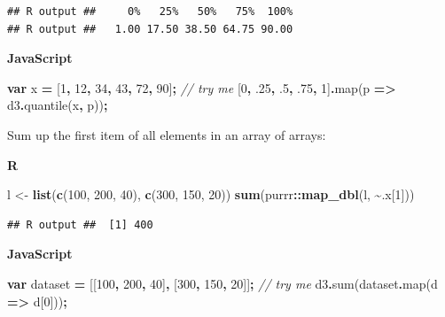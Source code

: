 \documentclass[
  openany]{book}
\newenvironment{Shaded}{\begin{snugshade}}{\end{snugshade}}
\newcommand{\CommentTok}[1]{\textcolor[rgb]{0.56,0.35,0.01}{\textit{#1}}}
\newcommand{\DecValTok}[1]{\textcolor[rgb]{0.00,0.00,0.81}{#1}}
\newcommand{\FloatTok}[1]{\textcolor[rgb]{0.00,0.00,0.81}{#1}}
\newcommand{\FunctionTok}[1]{\textcolor[rgb]{0.00,0.00,0.00}{#1}}
\newcommand{\KeywordTok}[1]{\textcolor[rgb]{0.13,0.29,0.53}{\textbf{#1}}}
\newcommand{\NormalTok}[1]{#1}
\newcommand{\OperatorTok}[1]{\textcolor[rgb]{0.81,0.36,0.00}{\textbf{#1}}}
\newcommand{\StringTok}[1]{\textcolor[rgb]{0.31,0.60,0.02}{#1}}
\begin{document}
\begin{verbatim}
## R output ##     0%   25%   50%   75%  100% 
## R output ##   1.00 17.50 38.50 64.75 90.00
\end{verbatim}

\textbf{JavaScript}

\begin{Shaded}
\begin{Highlighting}[]
\KeywordTok{var}\NormalTok{ x }\OperatorTok{=}\NormalTok{ [}\DecValTok{1}\OperatorTok{,} \DecValTok{12}\OperatorTok{,} \DecValTok{34}\OperatorTok{,} \DecValTok{43}\OperatorTok{,} \DecValTok{72}\OperatorTok{,} \DecValTok{90}\NormalTok{]}\OperatorTok{;}      \CommentTok{// try me}
\NormalTok{[}\DecValTok{0}\OperatorTok{,} \FloatTok{.25}\OperatorTok{,} \FloatTok{.5}\OperatorTok{,} \FloatTok{.75}\OperatorTok{,} \DecValTok{1}\NormalTok{]}\OperatorTok{.}\FunctionTok{map}\NormalTok{(p }\KeywordTok{=\textgreater{}}\NormalTok{ d3}\OperatorTok{.}\FunctionTok{quantile}\NormalTok{(x}\OperatorTok{,}\NormalTok{ p))}\OperatorTok{;}
\end{Highlighting}
\end{Shaded}

Sum up the first item of all elements in an array of arrays:

\textbf{R}

\begin{Shaded}
\begin{Highlighting}[]
\NormalTok{l \textless{}{-}}\StringTok{ }\KeywordTok{list}\NormalTok{(}\KeywordTok{c}\NormalTok{(}\DecValTok{100}\NormalTok{, }\DecValTok{200}\NormalTok{, }\DecValTok{40}\NormalTok{), }\KeywordTok{c}\NormalTok{(}\DecValTok{300}\NormalTok{, }\DecValTok{150}\NormalTok{, }\DecValTok{20}\NormalTok{))}
\KeywordTok{sum}\NormalTok{(purrr}\OperatorTok{::}\KeywordTok{map\_dbl}\NormalTok{(l, }\OperatorTok{\textasciitilde{}}\NormalTok{.x[}\DecValTok{1}\NormalTok{]))}
\end{Highlighting}
\end{Shaded}

\begin{verbatim}
## R output ##  [1] 400
\end{verbatim}

\textbf{JavaScript}

\begin{Shaded}
\begin{Highlighting}[]
\KeywordTok{var}\NormalTok{ dataset }\OperatorTok{=}\NormalTok{ [[}\DecValTok{100}\OperatorTok{,} \DecValTok{200}\OperatorTok{,} \DecValTok{40}\NormalTok{]}\OperatorTok{,}\NormalTok{ [}\DecValTok{300}\OperatorTok{,} \DecValTok{150}\OperatorTok{,} \DecValTok{20}\NormalTok{]]}\OperatorTok{;}     \CommentTok{// try me}
\NormalTok{d3}\OperatorTok{.}\FunctionTok{sum}\NormalTok{(dataset}\OperatorTok{.}\FunctionTok{map}\NormalTok{(d }\KeywordTok{=\textgreater{}}\NormalTok{ d[}\DecValTok{0}\NormalTok{]))}\OperatorTok{;}
\end{Highlighting}
\end{Shaded}
\end{document}
